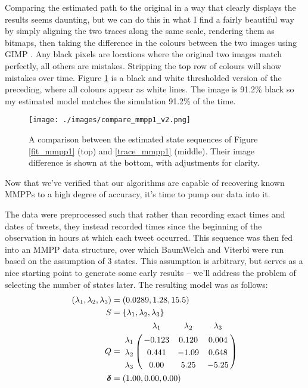 Comparing the estimated path to the original in a way that clearly displays the results seems daunting, but we can do this in what I find a fairly beautiful way by simply aligning the two traces along the same scale, rendering them as bitmaps, then taking the difference in the colours between the two images using GIMP \cite[eqn 8.15]{gimpdiff}. Any black pixels are locations where the original two images match perfectly, all others are mistakes. Stripping the top row of colours will show mistakes over time. Figure \ref{compare_mmpp1} is a black and white thresholded \cite{gimpthresh} version of the preceding, where all colours appear as white lines. The image is 91.2\% black so my estimated model matches the simulation 91.2\% of the time.

\begin{figure}[h!]
\centering
\texttt{[image: ./images/compare\_mmpp1\_v2.png]}
\caption{A comparison between the estimated state sequences of Figure \ref{fit_mmpp1} (top) and \ref{trace_mmpp1} (middle). Their image difference is shown at the bottom, with adjustments for clarity.}
\label{compare_mmpp1}
\end{figure}

Now that we've verified that our algorithms are capable of recovering known MMPPs to a high degree of accuracy, it's time to pump our data into it.

The data were preprocessed such that rather than recording exact times and dates of tweets, they instead recorded times since the beginning of the observation in hours at which each tweet occurred. This sequence was then fed into an MMPP data structure, over which BaumWelch and Viterbi were run based on the assumption of 3 states. This assumption is arbitrary, but serves as a nice starting point to generate some early results -- we'll address the problem of selecting the number of states later. The resulting model was as follows:
\begin{align*}
(\lambda_1,\lambda_2,\lambda_3) &= (0.0289,1.28,15.5)\\
S &= \{\lambda_1,\lambda_2,\lambda_3\}\\
Q &= \bordermatrix{      & \lambda_1 & \lambda_2 & \lambda_3\cr
                \lambda_1 & -0.123 & 0.120 & 0.004 \cr
                \lambda_2 & 0.441 & -1.09 & 0.648 \cr
                \lambda_3 & 0.00 & 5.25 & -5.25 \cr
			}\\
\bm{\delta} &= (1.00,0.00,0.00)
\end{align*}

